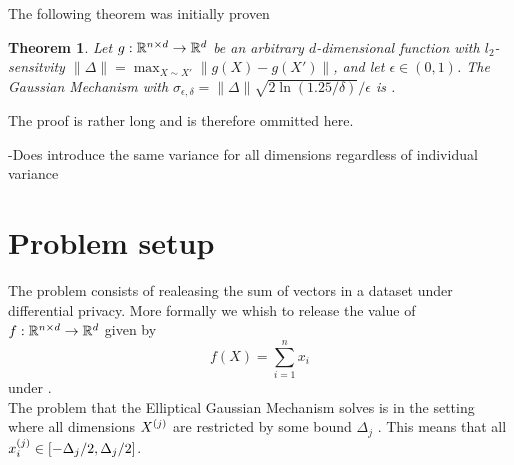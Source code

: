 \documentclass[a4paper,12pt]{article}
\newtheorem{theorem}{Theorem}
\begin{document}
The following theorem was initially proven
\begin{theorem}\textnormal{\cite{dpbasic}}
Let $g: \mathbb{R}^{n \times d} \rightarrow \mathbb{R}^{d}$ be an arbitrary 
$d$-dimensional function with $l_2$-sensitvity 
$\| \Delta \| = \max_{X \sim X'} \| g(X) - g(X') \|$, 
and let $\epsilon \in (0,1)$.
The Gaussian Mechanism with
$\sigma_{\epsilon, \delta} = \| \Delta \| \sqrt{2\ln(1.25/\delta)}/\epsilon$ 
is \edp.
\end{theorem}
The proof is rather long and is therefore ommitted here.

-Does introduce the same variance for all dimensions regardless of individual variance

\section{Problem setup}
The problem consists of realeasing the sum of vectors 
in a dataset under differential privacy.
More formally we whish to release the value of 
$f:\mathbb{R}^{n \times d} \rightarrow  \mathbb{R}^d$ given by
\[ f(X) = \sum_{i = 1}^n x_i  \] 
under \edp. \\
The problem that the Elliptical Gaussian Mechanism solves 
is in the setting where all dimensions $X^{(j)}$ are restricted
by some bound $\Delta_j$ \cite{Lebeda2022}. This means that all 
$ x^{(j)}_i \in \left [-\Delta_j/2, \Delta_j/2 \right] $.


{}

\end{document}
